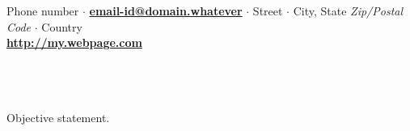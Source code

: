 \documentclass[letterpaper,10pt]{article}
\begin{document}


\vspace{-0.0in}\hspace{2in} \\
{\begin{center} \\
\vspace{0.1cm}

Phone number $\cdot$ {\bf \href{mailto:email-id@domain.whatever}{email-id@domain.whatever}} $\cdot$ Street $\cdot$ City, State {\it Zip/Postal Code} $\cdot$ Country \\

{\bf \url{http://my.webpage.com}} \end{center} }\ \\
\vspace{-1.3cm}\ \\

\hspace{-1.5cm}{\bf OBJECTIVE}\\
Objective statement.
\vspace{-0.15cm}\\
\end{document}
